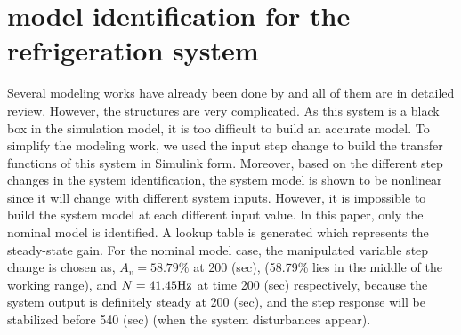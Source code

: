 \documentclass{ifacconf}
\begin{document}
\section{model identification for the refrigeration system}
 Several modeling works have already been done by \cite{macarthur1983application,mckinley2008advanced,li2010dynamic,pangborn2015comparison} and all of them are in detailed review. However, the structures are very complicated. As this system is a black box in the simulation model, it is too difficult to build an accurate model. To simplify the modeling work, we used the input step change to build the transfer functions of this system in Simulink form. %
  Moreover, based on the different step changes in the system identification, the system model is shown to be nonlinear since it will change with different system inputs. However, it is impossible to build the system model at each different input value. In this paper, only the nominal model is identified. A lookup table is generated which represents the steady-state gain. %
  For the nominal model case, the manipulated variable step change is chosen as, $A_v=58.79\%$ at 200 (sec), (58.79\% lies in the middle of the working range), and $N=41.45\rm{Hz}$ at time 200 (sec) respectively, because the system output is definitely steady at 200 (sec), and the step response will be stabilized before 540 (sec) (when the system disturbances appear).


%
\end{document}

